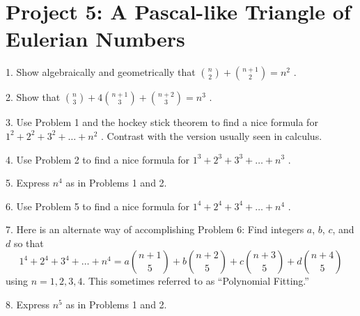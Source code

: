 \documentclass[10pt,]{book}
\theoremstyle{plain}
\theoremstyle{definition}
\theoremstyle{definition}
\theoremstyle{definition}
\numberwithin{equation}{chapter}
\begin{document}
\section[{Project 5: A Pascal-like Triangle of Eulerian Numbers}]{Project 5: A Pascal-like Triangle of Eulerian Numbers}\label{exercises-5}
\begin{exerciselist}
\item[1.]\hypertarget{exercise-35}{}\hypertarget{p-1788}{}%
Show algebraically and geometrically that \(\binom{n}{2}
+
\binom{n + 1}{2}
= n^{2}\) .%
\par\smallskip
\item[2.]\hypertarget{exercise-36}{}\hypertarget{p-1789}{}%
Show that \(\binom{n}{3}
+ 4
\binom{n + 1}{3}
+
\binom{n + 2}{3}
= n^{3}\) .%
\par\smallskip
\item[3.]\hypertarget{exercise-37}{}\hypertarget{p-1790}{}%
Use Problem 1 and the hockey stick theorem to find a nice formula for \(1^{2} + 2^{2} + 3^{2} + \ldots + n^{2}\) . Contrast with the version usually seen in calculus.%
\par\smallskip
\item[4.]\hypertarget{exercise-38}{}\hypertarget{p-1791}{}%
Use Problem 2 to find a nice formula for \(1^{3} + 2^{3} + 3^{3} + \ldots + n^{3}\) .%
\par\smallskip
\item[5.]\hypertarget{exercise-39}{}\hypertarget{p-1792}{}%
Express \(n^{4}\) as in Problems 1 and 2.%
\par\smallskip
\item[6.]\hypertarget{exercise-40}{}\hypertarget{p-1793}{}%
Use Problem 5 to find a nice formula for \(1^{4} + 2^{4} + 3^{4} + \ldots + n^{4}\) .%
\par\smallskip
\item[7.]\hypertarget{exercise-41}{}\hypertarget{p-1794}{}%
Here is an alternate way of accomplishing Problem 6:  Find integers \(a\), \(b\), \(c\), and \(d\) so that%
\begin{equation*}
1^{4} + 2^{4} + 3^{4} + \ldots + n^{4} = a\binom{n + 1}{5}  + b\binom{n + 2}{5}  + c\binom{n + 3}{5}  + d\binom{n + 4}{5}
\end{equation*}
using \(n=1, 2, 3, 4\). This sometimes referred to as ``Polynomial Fitting.''%
\par\smallskip
\item[8.]\hypertarget{exercise-42}{}\hypertarget{p-1795}{}%
Express \(n^{5}\) as in Problems 1 and 2.%
\par\smallskip

\end{exerciselist}
\end{document}
